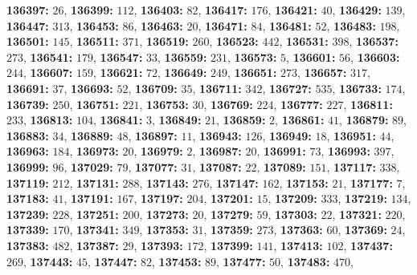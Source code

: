 \textsf{\bfseries 136397:} $26$, \textsf{\bfseries 136399:} $112$, \textsf{\bfseries 136403:} $82$, \textsf{\bfseries 136417:} $176$, \textsf{\bfseries 136421:} $40$, \textsf{\bfseries 136429:} $139$, \textsf{\bfseries 136447:} $313$, \textsf{\bfseries 136453:} $86$, \textsf{\bfseries 136463:} $20$, \textsf{\bfseries 136471:} $84$, \textsf{\bfseries 136481:} $52$, \textsf{\bfseries 136483:} $198$, \textsf{\bfseries 136501:} $145$, \textsf{\bfseries 136511:} $371$, \textsf{\bfseries 136519:} $260$, \textsf{\bfseries 136523:} $442$, \textsf{\bfseries 136531:} $398$, \textsf{\bfseries 136537:} $273$, \textsf{\bfseries 136541:} $179$, \textsf{\bfseries 136547:} $33$, \textsf{\bfseries 136559:} $231$, \textsf{\bfseries 136573:} $5$, \textsf{\bfseries 136601:} $56$, \textsf{\bfseries 136603:} $244$, \textsf{\bfseries 136607:} $159$, \textsf{\bfseries 136621:} $72$, \textsf{\bfseries 136649:} $249$, \textsf{\bfseries 136651:} $273$, \textsf{\bfseries 136657:} $317$, \textsf{\bfseries 136691:} $37$, \textsf{\bfseries 136693:} $52$, \textsf{\bfseries 136709:} $35$, \textsf{\bfseries 136711:} $342$, \textsf{\bfseries 136727:} $535$, \textsf{\bfseries 136733:} $174$, \textsf{\bfseries 136739:} $250$, \textsf{\bfseries 136751:} $221$, \textsf{\bfseries 136753:} $30$, \textsf{\bfseries 136769:} $224$, \textsf{\bfseries 136777:} $227$, \textsf{\bfseries 136811:} $233$, \textsf{\bfseries 136813:} $104$, \textsf{\bfseries 136841:} $3$, \textsf{\bfseries 136849:} $21$, \textsf{\bfseries 136859:} $2$, \textsf{\bfseries 136861:} $41$, \textsf{\bfseries 136879:} $89$, \textsf{\bfseries 136883:} $34$, \textsf{\bfseries 136889:} $48$, \textsf{\bfseries 136897:} $11$, \textsf{\bfseries 136943:} $126$, \textsf{\bfseries 136949:} $18$, \textsf{\bfseries 136951:} $44$, \textsf{\bfseries 136963:} $184$, \textsf{\bfseries 136973:} $20$, \textsf{\bfseries 136979:} $2$, \textsf{\bfseries 136987:} $20$, \textsf{\bfseries 136991:} $73$, \textsf{\bfseries 136993:} $397$, \textsf{\bfseries 136999:} $96$, \textsf{\bfseries 137029:} $79$, \textsf{\bfseries 137077:} $31$, \textsf{\bfseries 137087:} $22$, \textsf{\bfseries 137089:} $151$, \textsf{\bfseries 137117:} $338$, \textsf{\bfseries 137119:} $212$, \textsf{\bfseries 137131:} $288$, \textsf{\bfseries 137143:} $276$, \textsf{\bfseries 137147:} $162$, \textsf{\bfseries 137153:} $21$, \textsf{\bfseries 137177:} $7$, \textsf{\bfseries 137183:} $41$, \textsf{\bfseries 137191:} $167$, \textsf{\bfseries 137197:} $204$, \textsf{\bfseries 137201:} $15$, \textsf{\bfseries 137209:} $333$, \textsf{\bfseries 137219:} $134$, \textsf{\bfseries 137239:} $228$, \textsf{\bfseries 137251:} $200$, \textsf{\bfseries 137273:} $20$, \textsf{\bfseries 137279:} $59$, \textsf{\bfseries 137303:} $22$, \textsf{\bfseries 137321:} $220$, \textsf{\bfseries 137339:} $170$, \textsf{\bfseries 137341:} $349$, \textsf{\bfseries 137353:} $31$, \textsf{\bfseries 137359:} $273$, \textsf{\bfseries 137363:} $60$, \textsf{\bfseries 137369:} $24$, \textsf{\bfseries 137383:} $482$, \textsf{\bfseries 137387:} $29$, \textsf{\bfseries 137393:} $172$, \textsf{\bfseries 137399:} $141$, \textsf{\bfseries 137413:} $102$, \textsf{\bfseries 137437:} $269$, \textsf{\bfseries 137443:} $45$, \textsf{\bfseries 137447:} $82$, \textsf{\bfseries 137453:} $89$, \textsf{\bfseries 137477:} $50$, \textsf{\bfseries 137483:} $470$, 
